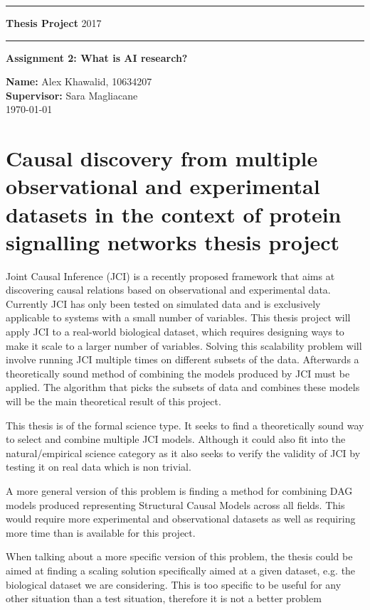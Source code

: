 \documentclass[11pt]{article}
\begin{document}
\rule{\textwidth}{1pt}

\textbf{Thesis Project} \hfill 2017
\rule{\textwidth}{1pt}
\vspace*{20pt}


\textbf{Assignment 2: What is AI research?}

\textbf{Name:} Alex Khawalid, 10634207\\
\textbf{Supervisor:} Sara Magliacane\\
\today

\section{Causal discovery from multiple observational and experimental datasets in the context of protein signalling networks thesis project}
Joint Causal Inference (JCI) is a recently proposed framework that aims at discovering causal relations based on observational and experimental data. Currently JCI has only been tested on simulated data and is exclusively applicable to systems with a small number of variables. This thesis project will apply JCI to a real-world biological dataset, which requires designing ways to make it scale to a larger number of variables. Solving this scalability problem will involve running JCI multiple times on different subsets of the data. Afterwards a theoretically sound method of combining the models produced by JCI must be applied. The algorithm that picks the subsets of data and combines these models will be the main theoretical result of this project.

This thesis is of the formal science type. It seeks to find a theoretically sound way to select and combine multiple JCI models. Although it could also fit into the natural/empirical science category as it also seeks to verify the validity of JCI by testing it on real data which is non trivial.

A more general version of this problem is finding a method for combining DAG models produced representing Structural Causal Models across all fields. This would require more experimental and observational datasets as well as requiring more time than is available for this project.

When talking about a more specific version of this problem, the thesis could be aimed at finding a scaling solution specifically aimed at a given dataset, e.g. the biological dataset we are considering. This is too specific to be useful for any other situation than a test situation, therefore it is not a better problem
\end{document}
